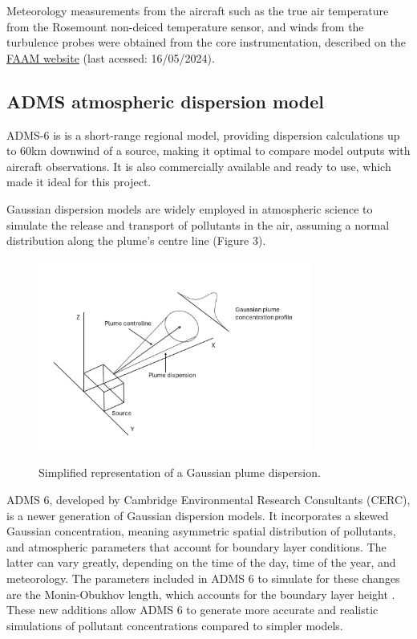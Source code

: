 \documentclass[12pt]{article}
\begin{document}
Meteorology measurements from the aircraft such as the true air temperature from the Rosemount non-deiced temperature sensor, and winds from the turbulence probes were obtained from the core instrumentation, described on the \href{https://www.faam.ac.uk/sphinx/coredata/dynamic_content/coredata.html#variable-attributes}{ FAAM website} (last acessed: 16/05/2024).


\subsection{ADMS atmospheric dispersion model}

ADMS-6 is is a short-range regional model, providing dispersion calculations up to 60km downwind of a source, making it optimal to compare model outputs with aircraft observations. It is also commercially available and ready to use, which made it ideal for this project.  

Gaussian dispersion models are widely employed in atmospheric science to simulate the release and transport of pollutants in the air, assuming a normal distribution along the plume's centre line (Figure 3). 

\begin{figure}[H]
\centering
\includegraphics[width=0.8\textwidth]{Plots/gaussian plume.png}
\caption{\label{fig:gauss_plume}} Simplified representation of a Gaussian plume dispersion.  
\end{figure}

ADMS 6, developed by Cambridge Environmental Research Consultants (CERC), is a newer generation of Gaussian dispersion models. It incorporates a skewed Gaussian concentration, meaning asymmetric spatial distribution of pollutants, and atmospheric parameters that account for boundary layer conditions. The latter can vary greatly, depending on the time of the day, time of the year, and meteorology. The parameters included in ADMS 6 to simulate   for these changes are the Monin-Obukhov length, which accounts for the boundary layer height \parencite{Sathe2011ComparisonSea}. These new additions allow ADMS 6 to generate more accurate and realistic simulations of pollutant concentrations compared to simpler models.
\end{document}
